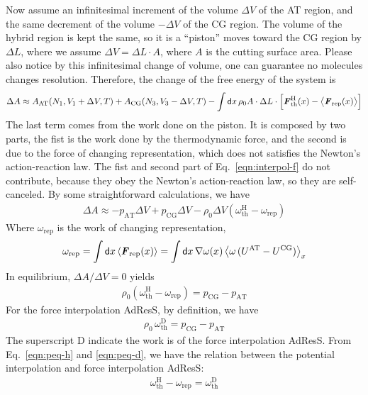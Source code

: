 \documentclass[aip,jcp,a4paper,reprint,onecolumn]{revtex4-1}
\newcommand{\vect}[1]{\textbf{\textit{#1}}}
\newcommand{\dd}[0]{\textsf{d}}
\newcommand{\AT}{{\textrm{{AT}}}}
\newcommand{\CG}{{\textrm{CG}}}
\newcommand{\thf}{{\textrm{th}}}
\newcommand{\res}{{\textrm{rep}}}
\newcommand{\hadress}{{\textrm{H}}}
\newcommand{\dadress}{{\textrm{D}}}
\begin{document}
\noindent
Now assume an infinitesimal increment of the volume $\Delta V$ of the
AT region, and the same decrement of the volume $-\Delta V$ of the CG
region.  The volume of the hybrid region is kept the same,
so it is a ``piston''
moves toward the CG region by $\Delta L$,
where we assume $\Delta V = \Delta L\cdot A$, where $A$ is the
cutting surface area.
Please also notice by this infinitesimal change of volume, one can
guarantee no molecules changes resolution.
Therefore, the change of the free energy of the system is
\begin{align}
  \Delta A \approx
  A_\AT(N_1, V_1+\Delta V, T) +
  A_\CG(N_3, V_3-\Delta V, T) -
  \int\dd x\, \rho_0 A\cdot \Delta L\cdot
  \Big[
  \vect F^\hadress_\thf(x) -
  \big\langle \vect F_\res(x)\big\rangle
  \Big]
\end{align}
The last term comes from the work done on the piston. It is composed by
two parts, the fist is the work done by the thermodynamic force, and the
second is due to 
the force of changing representation, which does not satisfies the Newton's
action-reaction law. The fist and second part of Eq.~\eqref{eqn:interpol-f}
do not contribute, because they obey the Newton's action-reaction law, so
they are self-canceled.
By some straightforward calculations, we have 
\begin{align}\label{eqn:peq-d}
  \Delta A \approx
  -p_\AT\Delta V + p_\CG\Delta V -
  \rho_0 \Delta V (\omega_\thf^\hadress - \omega_\res)  
\end{align}
Where $ \omega_\res$ is the work of changing representation,
\begin{align}
  \omega_\res
  = \int\dd x\,\langle \vect F_\res (x)\rangle
  = \int\dd x\,\nabla\omega(x)\,
  \big\langle \omega\, (U^\AT - U^\CG)\big\rangle_x
\end{align}
In equilibrium, $\Delta A / \Delta V = 0$ yields
\begin{align}\label{eqn:peq-h}
  \rho_0 (\omega_\thf^\hadress - \omega_\res) = p_\CG - p_\AT
\end{align}
For the force interpolation AdResS, by definition, we have
\begin{align}\label{eqn:peq-d}
  \rho_0\, \omega_\thf^\dadress  = p_\CG - p_\AT  
\end{align}
The superscript D indicate the work is of the force interpolation AdResS.
From Eq.~\eqref{eqn:peq-h} and \eqref{eqn:peq-d}, we have the relation between
the potential interpolation and force interpolation AdResS:
\begin{align}\label{eqn:hd-rel}
  \omega_\thf^\hadress - \omega_\res =  \omega_\thf^\dadress 
\end{align}
\end{document}
